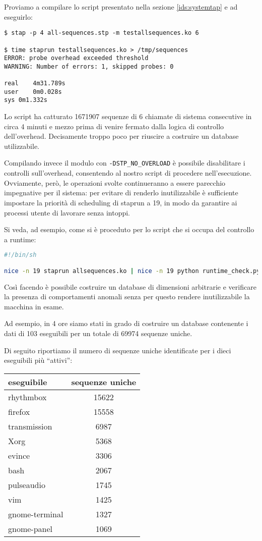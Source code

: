 \documentclass[11pt]{article}
\begin{document}
Proviamo a compilare lo script presentato nella sezione \ref{ids:systemtap} e
ad eseguirlo:

\begin{lstlisting}
$ stap -p 4 all-sequences.stp -m testallsequences.ko 6

$ time staprun testallsequences.ko > /tmp/sequences
ERROR: probe overhead exceeded threshold
WARNING: Number of errors: 1, skipped probes: 0

real    4m31.789s
user    0m0.028s
sys 0m1.332s
\end{lstlisting}

Lo script ha catturato 1671907 sequenze di 6 chiamate di sistema consecutive in
circa 4 minuti e mezzo prima di venire fermato dalla logica di controllo
dell'overhead. Decisamente troppo poco per riuscire a costruire un database
utilizzabile.

Compilando invece il modulo con \verb|-DSTP_NO_OVERLOAD| è possibile
disabilitare i controlli sull'overhead, consentendo al nostro script di
procedere nell'esecuzione. Ovviamente, però, le operazioni svolte continueranno
a essere parecchio impegnative per il sistema: per evitare di renderlo
inutilizzabile è sufficiente impostare la priorità di scheduling di staprun a
19, in modo da garantire ai processi utente di lavorare senza intoppi.

Si veda, ad esempio, come si è proceduto per lo script che si occupa del
controllo a runtime:
\begin{lstlisting}[language=bash]
#!/bin/sh

nice -n 19 staprun allsequences.ko | nice -n 19 python runtime_check.py
\end{lstlisting}

Così facendo è possibile costruire un database di dimensioni arbitrarie e
verificare la presenza di comportamenti anomali senza per questo rendere
inutilizzabile la macchina in esame.

Ad esempio, in 4 ore siamo stati in grado di costruire un database contenente i
dati di 103 eseguibili per un totale di 69974 sequenze uniche.

Di seguito riportiamo il numero di sequenze uniche identificate per i dieci
eseguibili più ``attivi'':

\begin{tabular}{l c}
eseguibile      & sequenze uniche \\
\hline
rhythmbox       & 15622 \\
firefox         & 15558 \\
transmission    & 6987 \\
Xorg            & 5368 \\
evince          & 3306 \\
bash            & 2067 \\
pulseaudio      & 1745 \\
vim             & 1425 \\
gnome-terminal  & 1327 \\
gnome-panel     & 1069 \\
\end{tabular}
\end{document}
